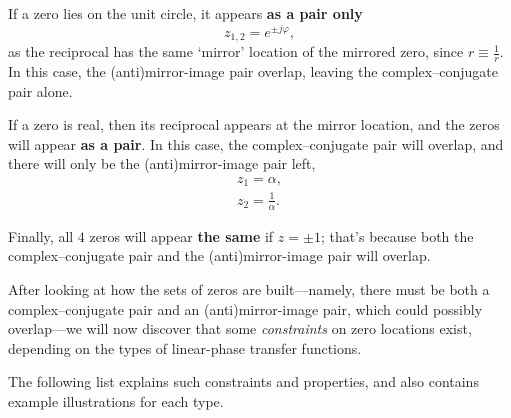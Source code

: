 \documentclass[\documentfontsize, twocolumn]{\classname}
\begin{document}
If a zero lies on the unit circle, it appears \textbf{as a pair only}
\begin{equation}\label{eqn:linearPhaseGeneralZeroLocationsPair}
    z_{1,2} = e^{\pm j\varphi},
\end{equation}
as the reciprocal has the same `mirror' location of the mirrored zero, since $r \equiv \frac 1 r$. In this case, the (anti)mirror-image pair overlap, leaving the complex--conjugate pair alone.

If a zero is real, then its reciprocal appears at the mirror location, and the zeros will appear \textbf{as a pair}. In this case, the complex--conjugate pair will overlap, and there will only be the (anti)mirror-image pair left,
\begin{eqnarray}\label{eqn:linearPhaseGeneralZeroLocationsPairReal}
    z_1 = \alpha, \\
    z_2 = \frac 1 \alpha.
\end{eqnarray}

Finally, all $4$ zeros will appear \textbf{the same} if $z=\pm1$; that's because both the complex--conjugate pair and the (anti)mirror-image pair will overlap.

After looking at how the sets of zeros are built---namely, there must be both a complex--conjugate pair and an (anti)mirror-image pair, which could possibly overlap---we will now discover that some \emph{constraints} on zero locations exist, depending on the types of linear-phase transfer functions. 

The following list explains such constraints and properties, and also contains example illustrations for each type.
\end{document}
